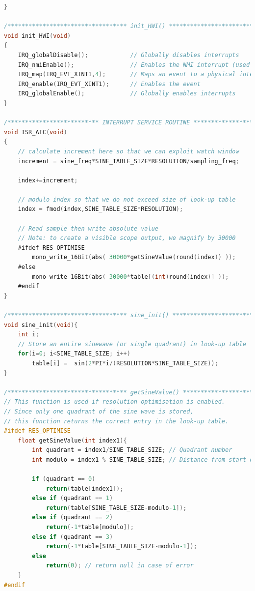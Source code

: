 \documentclass{article}
\begin{document}
\begin{lstlisting}[language=C, caption=C-code to generate interrupt driven rectified sine wave (using a look-up table), label = lst:init_hardware]
}

/********************************** init_HWI() **************************************/  
void init_HWI(void)
{
    IRQ_globalDisable();            // Globally disables interrupts
    IRQ_nmiEnable();                // Enables the NMI interrupt (used by the debugger)
    IRQ_map(IRQ_EVT_XINT1,4);       // Maps an event to a physical interrupt
    IRQ_enable(IRQ_EVT_XINT1);      // Enables the event
    IRQ_globalEnable();             // Globally enables interrupts
} 

/************************** INTERRUPT SERVICE ROUTINE *******************************/  
void ISR_AIC(void)
{
    // calculate increment here so that we can exploit watch window
    increment = sine_freq*SINE_TABLE_SIZE*RESOLUTION/sampling_freq;
    
    index+=increment;
    
    // modulo index so that we do not exceed size of look-up table	   
    index = fmod(index,SINE_TABLE_SIZE*RESOLUTION);
    
    // Read sample then write absolute value
    // Note: to create a visible scope output, we magnify by 30000
    #ifdef RES_OPTIMISE
        mono_write_16Bit(abs( 30000*getSineValue(round(index)) ));
    #else
        mono_write_16Bit(abs( 30000*table[(int)round(index)] ));
    #endif
}

/********************************** sine_init() *************************************/
void sine_init(void){
    int i;
    // Store an entire sinewave (or single quadrant) in look-up table
    for(i=0; i<SINE_TABLE_SIZE; i++)
    	table[i] =  sin(2*PI*i/(RESOLUTION*SINE_TABLE_SIZE));
}

/********************************** getSineValue() **********************************/
// This function is used if resolution optimisation is enabled.
// Since only one quadrant of the sine wave is stored, 
// this function returns the correct entry in the look-up table.
#ifdef RES_OPTIMISE
    float getSineValue(int index1){
        int quadrant = index1/SINE_TABLE_SIZE; // Quadrant number
        int modulo = index1 % SINE_TABLE_SIZE; // Distance from start of quadrant
        
        if (quadrant == 0)
            return(table[index1]);
        else if (quadrant == 1)
            return(table[SINE_TABLE_SIZE-modulo-1]);
        else if (quadrant == 2)
            return(-1*table[modulo]);
        else if (quadrant == 3)
            return(-1*table[SINE_TABLE_SIZE-modulo-1]);	
        else
            return(0); // return null in case of error
    }
#endif
\end{lstlisting}
\end{document}

